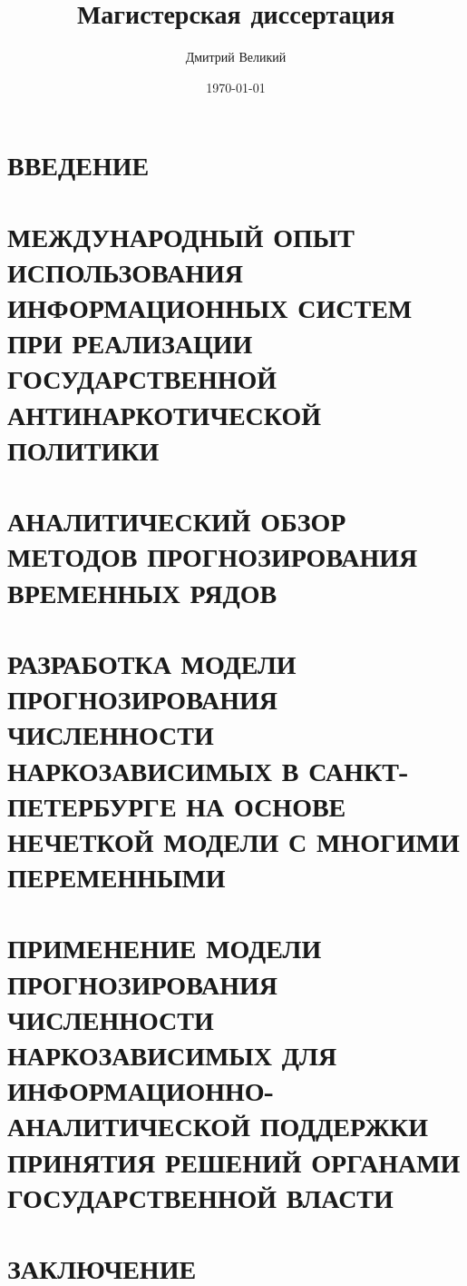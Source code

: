 \documentclass[a4paper,14pt]{report}
\author{Дмитрий Великий}
\title{Магистерская диссертация}
\date{\today}
\begin{document}
\tableofcontents
\chapter*{ВВЕДЕНИЕ}

\chapter{МЕЖДУНАРОДНЫЙ ОПЫТ ИСПОЛЬЗОВАНИЯ ИНФОРМАЦИОННЫХ СИСТЕМ ПРИ РЕАЛИЗАЦИИ
    ГОСУДАРСТВЕННОЙ АНТИНАРКОТИЧЕСКОЙ ПОЛИТИКИ}

\chapter{АНАЛИТИЧЕСКИЙ ОБЗОР МЕТОДОВ ПРОГНОЗИРОВАНИЯ ВРЕМЕННЫХ РЯДОВ}

\chapter{РАЗРАБОТКА МОДЕЛИ ПРОГНОЗИРОВАНИЯ ЧИСЛЕННОСТИ НАРКОЗАВИСИМЫХ В 
САНКТ-ПЕТЕРБУРГЕ НА ОСНОВЕ НЕЧЕТКОЙ МОДЕЛИ С МНОГИМИ ПЕРЕМЕННЫМИ}

\chapter{ПРИМЕНЕНИЕ МОДЕЛИ ПРОГНОЗИРОВАНИЯ ЧИСЛЕННОСТИ НАРКОЗАВИСИМЫХ ДЛЯ
    ИНФОРМАЦИОННО-АНАЛИТИЧЕСКОЙ ПОДДЕРЖКИ ПРИНЯТИЯ РЕШЕНИЙ ОРГАНАМИ
    ГОСУДАРСТВЕННОЙ ВЛАСТИ}

\chapter*{ЗАКЛЮЧЕНИЕ}

\newpage
\printbibliography[title={БИБЛИОГРАФИЧЕСКИЙ СПИСОК},heading=bibintoc]
\end{document}
